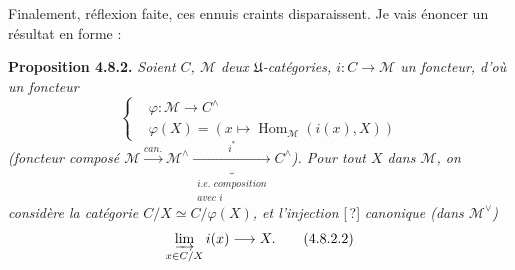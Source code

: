 \documentclass[11pt]{article}
\newcommand{\Hom}{\operatorname{Hom}}
\begin{document}
Finalement, réflexion faite, ces ennuis craints disparaissent. Je vais énoncer un résultat en forme :

\textbf{Proposition 4.8.2.} \textit{Soient $C$, $\mathcal{M}$ deux $\mathfrak{U}$-catégories, $i : C \longrightarrow \mathcal{M}$ un foncteur, d'où un foncteur}
\[ \left\{\begin{aligned}
&\varphi : \mathcal{M} \longrightarrow C^{\wedge}\\
&\varphi(X) = (x \longmapsto \Hom_{\mathcal{M}}(i(x),X))
\end{aligned}\right. \tag*{(4.8.2.1)} \]
\textit{(foncteur composé $\mathcal{M} \xrightarrow{\textit{can.}} \mathcal{M}^{\wedge} \underbrace{\xrightarrow{i^*}}_{\substack{\textit{i.e. composition}\\ \textit{avec } i}} C^{\wedge}$). Pour tout $X$ dans $\mathcal{M}$, on considère la catégorie $C/X \simeq C/\varphi(X)$, et l'injection} [\,?] \textit{canonique (dans $\mathcal{M}^{\vee}$)}
\[ \varinjlim_{x\in C/X} i(x) \longrightarrow X . \tag*{(4.8.2.2)} \]
\end{document}
